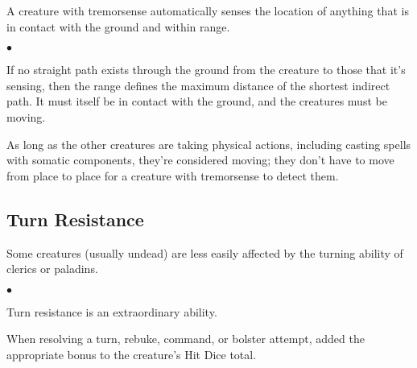 A creature with tremorsense automatically senses the location of anything that is in contact with the ground and within range.

\begin{list}{$\bullet$}{\itemspace}
	\item If no straight path exists through the ground from the creature to those that it's sensing, then the range defines the maximum distance of the shortest indirect path. It must itself be in contact with the ground, and the creatures must be moving. 
	\item As long as the other creatures are taking physical actions, including casting spells with somatic components, they're considered moving; they don't have to move from place to place for a creature with tremorsense to detect them.
\end{list}

\subsection{Turn Resistance}

Some creatures (usually undead) are less easily affected by the turning ability of clerics or paladins.

\begin{list}{$\bullet$}{\itemspace}
	\item Turn resistance is an extraordinary ability.
	\item When resolving a turn, rebuke, command, or bolster attempt, added the appropriate bonus to the creature's Hit Dice total. 
\end{list}